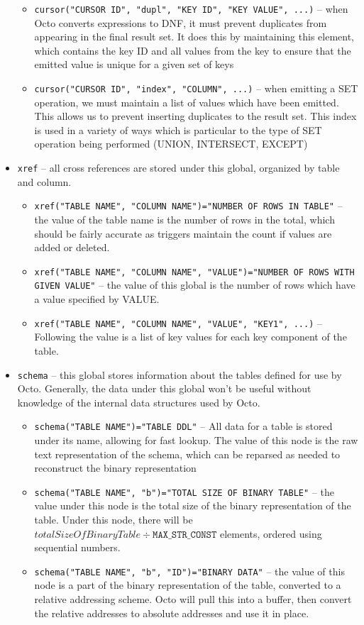 \documentclass[]{article}
\def\code#1{\texttt{#1}}
\begin{document}
\begin{itemize}
\begin{itemize}
		\item \code{cursor("CURSOR ID", "dupl", "KEY ID", "KEY VALUE", ...)} -- when Octo converts expressions to DNF, it must prevent duplicates from appearing in the final result set. It does this by maintaining this element, which contains the key ID and all values from the key to ensure that the emitted value is unique for a given set of keys
		\item \code{cursor("CURSOR ID", "index", "COLUMN", ...)} -- when emitting a SET operation, we must maintain a list of values which have been emitted. This allows us to prevent inserting duplicates to the result set. This index is used in a variety of ways which is particular to the type of SET operation being performed (UNION, INTERSECT, EXCEPT)
	\end{itemize}
	\item \code{xref} -- all cross references are stored under this global, organized by table and column.
	\begin{itemize}
		\item \code{xref("TABLE NAME", "COLUMN NAME")="NUMBER OF ROWS IN TABLE"} -- the value of the table name is the number of rows in the total, which should be fairly accurate as triggers maintain the count if values are added or deleted.
		\item \code{xref("TABLE NAME", "COLUMN NAME", "VALUE")="NUMBER OF ROWS WITH GIVEN VALUE"} -- the value of this global is the number of rows which have a value specified by VALUE.
		\item \code{xref("TABLE NAME", "COLUMN NAME", "VALUE", "KEY1", ...)} -- Following the value is a list of key values for each key component of the table.
	\end{itemize}
	\item \code{schema} -- this global stores information about the tables defined for use by Octo. Generally, the data under this global won't be useful without knowledge of the internal data structures used by Octo.
	\begin{itemize}
		\item \code{schema("TABLE NAME")="TABLE DDL"} -- All data for a table is stored under its name, allowing for fast lookup. The value of this node is the raw text representation of the schema, which can be reparsed as needed to reconstruct the binary representation
		\item \code{schema("TABLE NAME", "b")="TOTAL SIZE OF BINARY TABLE"} -- the value under this node is the total size of the binary representation of the table. Under this node, there will be $totalSizeOfBinaryTable \div \code{MAX\_STR\_CONST}$ elements, ordered using sequential numbers.
		\item \code{schema("TABLE NAME", "b", "ID")="BINARY DATA"} -- the value of this node is a part of the binary representation of the table, converted to a relative addressing scheme. Octo will pull this into a buffer, then convert the relative addresses to absolute addresses and use it in place.
	\end{itemize}
\end{itemize}
\end{document}

